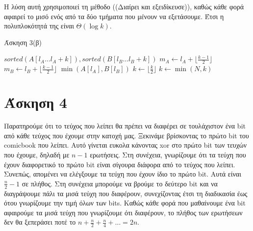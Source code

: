 \documentclass[11pt,a4paper]{book}
\begin{document}
Η λύση αυτή χρησιμοποιεί τη μέθοδο ((Διαίρει και εξειδίκευσε)), καθώς κάθε φορά αφαιρεί το μισό ενός από τα δύο τμήματα που μένουν να εξετάσουμε. Έτσι η πολυπλοκότητά της είναι $\Theta( \log k )$.

\begin{algorithm}[H]
\caption{\textgreek{Άσκηση 3(β)}}
\begin{algorithmic}[1]
\Require $sorted(A[l_A \dots l_A + k]), sorted(B[l_B \dots l_B + k])$
	\State $m_A \gets l_A + \lfloor \frac{k - 1}{2} \rfloor$
	\State $m_B \gets l_B + \lfloor \frac{k - 1}{2} \rfloor$
        \State \Return $\min( A[ l_A ], B[ l_B ] )$
    \EndIf
    \State $k \gets \lfloor \frac{k}{2} \rfloor$
        \State \Return {}
    \EndIf
    \State \Return {}
\EndProcedure
{}
	\State $k \gets \min(N, k)$
	\State \Return {}
\EndProcedure
\end{algorithmic}
\end{algorithm}

        
\section*{Άσκηση 4}
Παρατηρούμε ότι το τεύχος που λείπει θα πρέπει να διαφέρει σε τουλάχιστον ένα \textlatin{bit} από κάθε τεύχος που έχουμε στην κατοχή μας. Ξεκινάμε βρίσκοντας το πρώτο \textlatin{bit} του \textlatin{comicbook} που λείπει. Αυτό γίνεται ευκολα κάνοντας \textlatin{xor} στο πρώτο \textlatin{bit} των τευχών που έχουμε, δηλαδή με $n - 1$ ερωτήσεις. Στη συνέχεια, γνωρίζουμε ότι τα τεύχη που έχουν διαφορετικό το πρώτο \textlatin{bit} είναι σίγουρα διάφορα από το τεύχος που λείπει. Συνεπώς, απομένει να ελέγξουμε τα τεύχη που έχουν ίδιο το πρώτο \textlatin{bit}. Αυτά είναι $\frac{n}{2} - 1$ σε πλήθος. Στη συνέχεια μπορούμε να βρούμε το δεύτερο \textlatin{bit} και να διαγράψουμε πάλι τα μισά τεύχη που διαφέρουν, συνεχίζοντας έτσι τη διαδικασία έως ότου γνωρίζουμε την τιμή όλων των \textlatin{bits}. Καθώς κάθε φορά που μαθαίνουμε ένα \textlatin{bit} αφαιρούμε τα μισά τεύχη που γνωρίζουμε ότι διαφέρουν, το πλήθος των ερωτήσεων δεν θα ξεπεράσει ποτέ το $n + \frac{n}{2} + \frac{n}{4} + \dots = 2n$.
\end{document}
